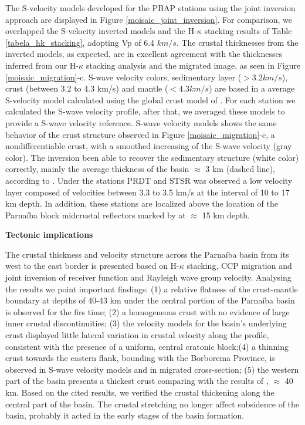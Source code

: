 \documentclass[paper,11pt]{geophysics}
\begin{document}
The S-velocity models developed for the PBAP stations using the joint inversion approach are displayed in Figure \ref{moisaic_joint_inversion}. For comparison, we overlapped the S-velocity inverted models and the H-$\kappa$ stacking results of Table \ref{tabela_hk_stacking}, adopting Vp of 6.4 $km/s$. The crustal thicknesses from the inverted models, as expected, are in excellent agreement with the thicknesses inferred from our H-$\kappa$ stacking analysis and the migrated image, as seen in Figure \ref{moisaic_migration}-c. S-wave velocity colors, sedimentary layer ($> 3.2 km/s$), crust (between 3.2 to 4.3 km/s) and mantle ($< 4.3 km/s$) are based in a average S-velocity model calculated using the global crust model of \cite{mooney_crust_1998}. For each station we calculated the S-wave velocity profile, after that, we averaged these models to provide a S-wave velocity reference. S-wave velocity models shows the same behavior of the crust structure observed in Figure \ref{moisaic_migration}-c, a nondifferentiable crust, with a smoothed increasing of the S-wave velocity (gray color). The inversion been able to recover the sedimentary structure (white color) correctly, mainly the average thickness of the basin $\approx$ 3 km (dashed line), according to \cite{vaz_bacia_2007}. Under the stations PRDT and STSR was observed a low velocity layer composed of velocities between 3.3 to 3.5 km/s at the interval of 10 to 17 km depth. In addition, these stations are localized above the location of the Parnaíba block midcrustal reflectors marked by \cite{daly_brasiliano_2014} at $\approx$ 15 km depth.
\linebreak
\linebreak

\begin{flushleft}
\textbf{\LARGE Tectonic implications}
\end{flushleft}

The crustal thickness and velocity structure across the Parnaíba basin from its west to the east border is presented based on H-$\kappa$ stacking, CCP migration and joint inversion of receiver function and Rayleigh wave group velocity. Analysing the results we point important findings: (1) a relative flatness of the crust-mantle boundary at depths of 40-43 km under the central portion of the Parnaíba basin is observed for the firs time; (2) a homogeneous crust with no evidence of large inner crustal discontinuities; (3) the velocity models for the basin's underlying crust displayed little lateral variation in crustal velocity along the profile, consistent with the presence of a uniform, central cratonic block;(4) a thinning crust towards the eastern flank, bounding with the Borborema Province,  is observed in S-wave velocity models and in migrated cross-section; (5) the western part of the basin presents a thickest crust comparing with the results of \cite{daly_brasiliano_2014}, $\approx$ 40 km. Based on the cited results, we verified the crustal thickening along the central part of the basin. The crustal stretching no longer affect subsidence of the basin, probably it acted in the early stages of the basin formation.
\end{document}
